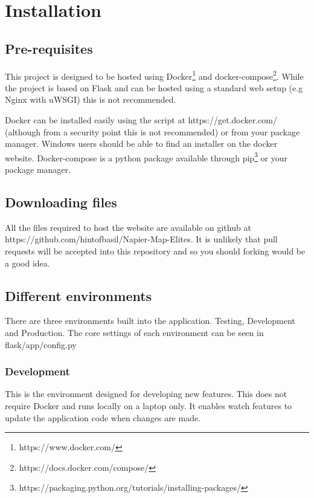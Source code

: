 \section{Installation}

\subsection{Pre-requisites}

This project is designed to be hosted using Docker\footnote{https://www.docker.com/} and docker-compose\footnote{https://docs.docker.com/compose/}.  While the project is based on Flask and can be hosted using a standard web setup (e.g Nginx with uWSGI) this is not recommended.

Docker can be installed easily using the script at https://get.docker.com/ (although from a security point this is not recommended) or from your package manager.  Windows users should be able to find an installer on the docker website.  Docker-compose is a python package available through pip\footnote{https://packaging.python.org/tutorials/installing-packages/} or your package manager.

\subsection{Downloading files}

All the files required to host the website are available on github at https://github.com/hintofbasil/Napier-Map-Elites.  It is unlikely that pull requests will be accepted into this repository and so you should forking would be a good idea.

\subsection{Different environments}

There are three environments built into the application.  Testing, Development and Production.  The core settings of each environment can be seen in flask/app/config.py

\subsubsection{Development}

This is the environment designed for developing new features.  This does not require Docker and runs locally on a laptop only.  It enables watch features to update the application code when changes are made.

